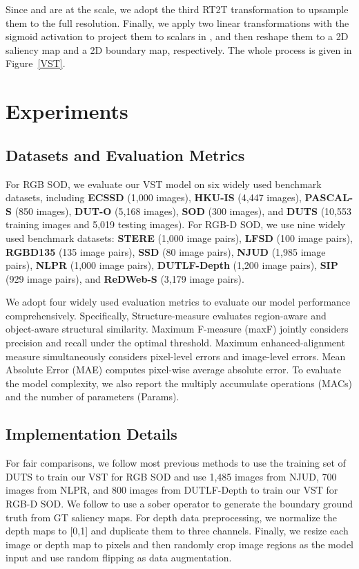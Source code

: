 \documentclass[10pt,twocolumn,letterpaper]{article}
\begin{document}
Since  and  are at the  scale, we adopt the third RT2T transformation to upsample them to the full resolution.  Finally, we apply two linear transformations with the sigmoid activation to project them to scalars in , and then reshape them to a 2D saliency map and a 2D boundary map, respectively. The whole process is given in Figure~\ref{VST}.


\section{Experiments}
\subsection{Datasets and Evaluation Metrics}
For RGB SOD, we evaluate our VST model on six widely used benchmark datasets, including \textbf{ECSSD} \cite{yan2013ECSSD} (1,000 images), \textbf{HKU-IS} \cite{li2015HKUIS} (4,447 images), \textbf{PASCAL-S} \cite{li2014PASCALS} (850 images), \textbf{DUT-O} \cite{yang2013DUTO} (5,168 images), \textbf{SOD} \cite{movahedi2010SOD} (300 images), and \textbf{DUTS} \cite{wang2017duts} (10,553 training images and 5,019 testing images).
For RGB-D SOD, we use nine widely used benchmark datasets: \textbf{STERE} \cite{niu2012stere} (1,000 image pairs), \textbf{LFSD} \cite{li2014lfsd} (100 image pairs), \textbf{RGBD135} \cite{cheng2014rgbd135} (135 image pairs), \textbf{SSD} \cite{zhu2017ssd} (80 image pairs), \textbf{NJUD} \cite{ju2014njud} (1,985 image pairs), \textbf{NLPR} \cite{peng2014nlpr} (1,000 image pairs), \textbf{DUTLF-Depth} \cite{Piao2019dmra} (1,200 image pairs), \textbf{SIP} \cite{fan2020SIP} (929 image pairs), and \textbf{ReDWeb-S} \cite{liu2020ReDWeb-S} (3,179 image pairs).

We adopt four widely used evaluation metrics to evaluate our model performance comprehensively. Specifically, 
Structure-measure  \cite{fan2017structure} evaluates region-aware and object-aware structural similarity. Maximum F-measure (maxF) jointly considers precision and recall under the optimal threshold. Maximum enhanced-alignment measure  \cite{Fan2018Enhanced} simultaneously considers pixel-level errors and image-level errors. Mean Absolute Error (MAE) computes pixel-wise average absolute error. To evaluate the model complexity, we also report the multiply accumulate operations (MACs) and the number of parameters (Params).

\subsection{Implementation Details}
For fair comparisons,
we follow most previous methods to use the training set of DUTS to train our VST for RGB SOD and use 1,485 images from NJUD, 700 images from NLPR, and 800 images from DUTLF-Depth to train our VST for RGB-D SOD.
We follow \cite{zhao2019EGNet} to use a sober operator to generate the boundary ground truth from GT saliency maps.
For depth data preprocessing, we normalize the depth maps to [0,1] and duplicate them to three channels.
Finally, we resize each image or depth map to  pixels and then randomly crop  image regions as the model input and use random flipping as data augmentation.
\end{document}
